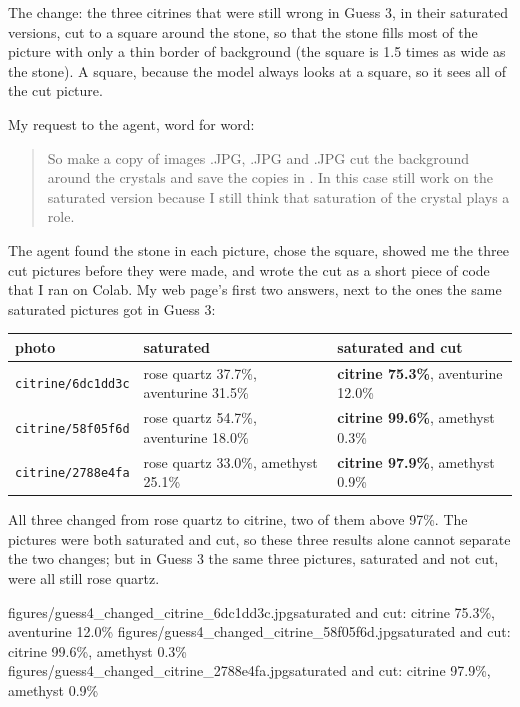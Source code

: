 \documentclass[11pt]{article}
\begin{document}
The change: the three citrines that were still wrong in Guess 3, in their
saturated versions, cut to a square around the stone, so that the stone fills
most of the picture with only a thin border of background (the square is 1.5
times as wide as the stone). A square, because the model always looks at a
square, so it sees all of the cut picture.

My request to the agent, word for word:
\begin{quote}
So make a copy of images
.JPG,
.JPG and
.JPG cut the
background around the crystals and save the copies in
. In this case still work on the saturated
version because I still think that saturation of the crystal plays a role.
\end{quote}

The agent found the stone in each picture, chose the square, showed me the three
cut pictures before they were made, and wrote the cut as a short piece of code
that I ran on Colab. My web page's first two answers, next to the ones the same saturated
pictures got in Guess 3:

\begin{center}\footnotesize
\begin{tabular}{lll}
\toprule
photo & saturated & saturated and cut \\
\midrule
\texttt{citrine/6dc1dd3c} & rose quartz 37.7\%, aventurine 31.5\% & \textbf{citrine 75.3\%}, aventurine 12.0\% \\
\texttt{citrine/58f05f6d} & rose quartz 54.7\%, aventurine 18.0\% & \textbf{citrine 99.6\%}, amethyst 0.3\% \\
\texttt{citrine/2788e4fa} & rose quartz 33.0\%, amethyst 25.1\% & \textbf{citrine 97.9\%}, amethyst 0.9\% \\
\bottomrule
\end{tabular}
\end{center}

All three changed from rose quartz to citrine, two of them above 97\%. The
pictures were both saturated and cut, so these three results alone cannot
separate the two changes; but in Guess 3 the same three pictures, saturated and
not cut, were all still rose quartz.

           {figures/guess4_changed_citrine_6dc1dd3c.jpg}{saturated and cut: citrine 75.3\%, aventurine 12.0\%}
           {figures/guess4_changed_citrine_58f05f6d.jpg}{saturated and cut: citrine 99.6\%, amethyst 0.3\%}
           {figures/guess4_changed_citrine_2788e4fa.jpg}{saturated and cut: citrine 97.9\%, amethyst 0.9\%}
\end{document}

